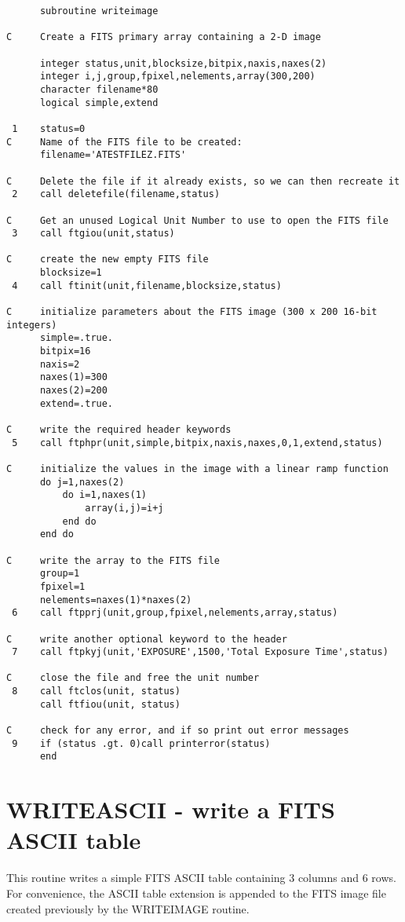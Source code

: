 \newpage
\footnotesize
\begin{verbatim}
      subroutine writeimage

C     Create a FITS primary array containing a 2-D image

      integer status,unit,blocksize,bitpix,naxis,naxes(2)
      integer i,j,group,fpixel,nelements,array(300,200)
      character filename*80
      logical simple,extend

 1    status=0
C     Name of the FITS file to be created:
      filename='ATESTFILEZ.FITS'

C     Delete the file if it already exists, so we can then recreate it
 2    call deletefile(filename,status)

C     Get an unused Logical Unit Number to use to open the FITS file
 3    call ftgiou(unit,status)

C     create the new empty FITS file
      blocksize=1
 4    call ftinit(unit,filename,blocksize,status)

C     initialize parameters about the FITS image (300 x 200 16-bit integers)
      simple=.true.
      bitpix=16
      naxis=2
      naxes(1)=300
      naxes(2)=200
      extend=.true.

C     write the required header keywords
 5    call ftphpr(unit,simple,bitpix,naxis,naxes,0,1,extend,status)

C     initialize the values in the image with a linear ramp function
      do j=1,naxes(2)
          do i=1,naxes(1)
              array(i,j)=i+j
          end do
      end do

C     write the array to the FITS file
      group=1
      fpixel=1
      nelements=naxes(1)*naxes(2)
 6    call ftpprj(unit,group,fpixel,nelements,array,status)

C     write another optional keyword to the header
 7    call ftpkyj(unit,'EXPOSURE',1500,'Total Exposure Time',status)

C     close the file and free the unit number
 8    call ftclos(unit, status)
      call ftfiou(unit, status)

C     check for any error, and if so print out error messages
 9    if (status .gt. 0)call printerror(status)
      end
\end{verbatim}
\normalsize
\newpage
\section{WRITEASCII - write a FITS ASCII table}

This routine writes a simple FITS ASCII table containing 3 columns
and 6 rows.  For convenience, the ASCII table extension is
appended to the FITS image file created previously by the
WRITEIMAGE routine.

